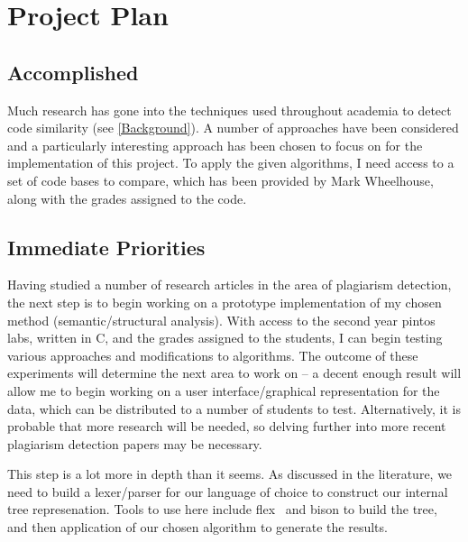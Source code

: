
\chapter{Project Plan} %

\label{ProjectPlan} %


\section{Accomplished}

Much research has gone into the techniques used throughout academia to detect 
code similarity (see \ref{Background}). A number of approaches have been considered
and a particularly interesting approach has been chosen to focus on for the 
implementation of this project. To apply the given algorithms, I need access to
a set of code bases to compare, which has been provided by Mark Wheelhouse, along
with the grades assigned to the code.

\section{Immediate Priorities}

Having studied a number of research articles in the area of plagiarism detection,
the next step is to begin working on a prototype implementation of my chosen
method (semantic/structural analysis). With access to the second year pintos labs,
written in C, and the grades assigned to the students, I can begin testing various
approaches and modifications to algorithms. The outcome of these experiments will
determine the next area to work on -- a decent enough result will allow me to
begin working on a user interface/graphical representation for the data, which
can be distributed to a number of students to test. Alternatively, it is probable
that more research will be needed, so delving further into more recent plagiarism
detection papers may be necessary.

This step is a lot more in depth than it seems. As discussed in the literature,
we need to build a lexer/parser for our language of choice to construct our
internal tree represenation. Tools to use here include flex~\cite{flex} and bison
\cite{bison} to build the tree, and then application of our chosen algorithm
to generate the results.

